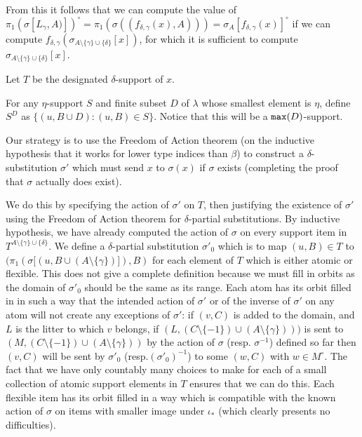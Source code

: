 \documentclass[12pt]{article}
\begin{document}
\begin{enumerate}
From this it follows that we can compute the value of $\pi_1(\sigma[L_\gamma,A)])^\circ = \pi_1( \sigma((f_{\delta,\gamma}(x),A))) = \sigma_{A}[ f_{\delta,\gamma}(x)]^\circ$ if we can compute $f_{\delta,\gamma}(\sigma_{A \setminus \{\gamma\}\cup \{\delta\}}[x])$,
for which it is sufficient to compute $\sigma_{A \setminus \{\gamma\}\cup \{\delta\}}[x]$.

Let $T$ be the designated $\delta$-support of $x$.

For any $\eta$-support $S$ and finite subset $D$ of $\lambda$ whose smallest element is $\eta$, define $S^D$ as $\{(u,B \cup D):(u,B) \in S\}$.  Notice that this will be a ${\tt max}(D)$-support.

Our strategy is to use the Freedom of Action theorem (on the inductive hypothesis that it works for lower type indices than $\beta$) to construct a $\delta$-substitution $\sigma'$ which must send $x$ to $\sigma(x)$ if $\sigma$ exists (completing the proof that $\sigma$ actually does exist).

We do this by specifying the action of $\sigma'$ on $T$, then justifying the existence of $\sigma'$ using the Freedom of Action theorem for $\delta$-partial substitutions.  By inductive hypothesis, we have already computed the action of $\sigma$ on every support item in $T^{A\setminus \{\gamma\}\cup \{\delta\}}$.
We define a $\delta$-partial substitution $\sigma'_0$ which is to map $(u,B) \in T$ to $(\pi_1(\sigma[(u,B \cup (A \setminus \{\gamma\})]),B)$ for each element of $T$ which is either atomic or flexible.  This does not give a complete definition because we must fill in orbits as the domain
of $\sigma'_0$ should be the same as its range.  Each atom has its orbit filled in in such a way that the intended action of $\sigma'$ or of the inverse of $\sigma'$ on any atom will not create any exceptions of $\sigma'$:  if $(v,C)$ is added to the domain, and $L$ is the litter to which $v$ belongs,
if $(L,(C \setminus \{-1\})\cup (A \setminus \{\gamma\})))$ is sent to $(M,(C \setminus \{-1\}) \cup (A \setminus \{\gamma\}))$ by the action of $\sigma$ (resp. $\sigma^{-1}$) defined so far then $(v,C)$ will be sent by $\sigma'_0$ (resp.$ (\sigma'_0)^{-1}$) to some $(w,C)$ with $w \in M^\circ$.  The fact that we have only countably many choices to make
for each of a small collection of atomic support elements in $T$ ensures that we can do this.  Each flexible item has its orbit filled in a way which is compatible with the known action of $\sigma$ on items with smaller image under $\iota_*$ (which clearly presents no difficulties).


\end{enumerate}
\end{document}
